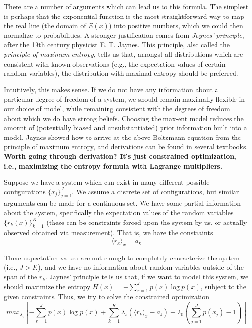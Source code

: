 \documentclass[a4paper]{article}
\begin{document}
There are a number of arguments which can lead us to this formula. The simplest is perhaps that the exponential function is the most straightforward way to map the real line (the domain of $E(x)$) into positive numbers, which we could then normalize to probabilities. A stronger justification comes from \emph{Jaynes' principle}, after the 19th century physicist E. T. Jaynes. This principle, also called the \emph{principle of maximum entropy}, tells us that, amongst all distributions which are consistent with known observations (e.g., the expectation values of certain random variables), the distribution with maximal entropy should be preferred. 

Intuitively, this makes sense. If we do not have any information about a particular degree of freedom of a system, we should remain maximally flexible in our choice of model, while remaining consistent with the degrees of freedom about which we do have strong beliefs. Choosing the max-ent model reduces the amount of (potentially biased and unsubstantiated) prior information built into a model. Jaynes showed how to arrive at the above Boltzmann equation from the principle of maximum entropy, and derivations can be found in several textbooks. \textbf{Worth going through derivation? It's just constrained optimization, i.e., maximizing the entropy formula with Lagrange multipliers.}

Suppose we have a system which can exist in many different possible configurations $\{x_j\}_{j=1}^J$. We assume a discrete set of configurations, but similar arguments can be made for a continuous set. We have some partial information about the system, specifically the expectation values of the random variables $\{r_k(x)\}_{k=1}^K$ (these can be constraints forced upon the system by us, or actually observed obtained via measurement). That is, we have the constraints 
\begin{equation}
 \langle r_k \rangle_{x} = a_k
\end{equation}

These expectation values are not enough to completely characterize the system (i.e., $J>K$), and we have no information about random variables outside of the span of the $r_k$. Jaynes' principle tells us that, if we want to model this system, we should maximize the entropy $H(x) = -\sum_{x=1}^J p(x) \log p(x)$, subject to the given constraints. Thus, we try to solve the constrained optimization
\begin{equation}
 \textit{max}_{\lambda_i}[-\sum_{x=1}^J p(x) \log p(x) + \sum_{k=1}^K \lambda_k (\langle r_k \rangle_{x} - a_k) + \lambda_0(\sum_{j=1}^J p(x_j) - 1)]
\end{equation}
\end{document}

